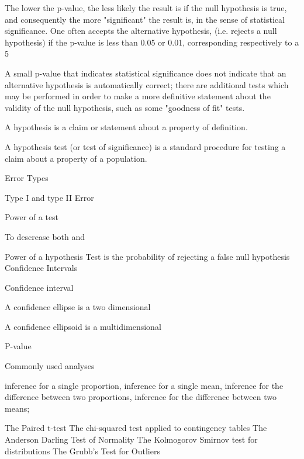 The lower the p-value, the less likely the result is if the null hypothesis is true, and consequently the more "significant" the result is, in the sense of statistical significance. One often accepts the alternative hypothesis, (i.e. rejects a null hypothesis) if the p-value is less than 0.05 or 0.01, corresponding respectively to a 5%
 
A small p-value that indicates statistical significance does not indicate that an alternative hypothesis is automatically correct; there are additional tests which may be performed in order to make a more definitive statement about the validity of the null hypothesis, such as some "goodness of fit" tests.
 
A hypothesis is a claim or statement about a property of definition.
 
A hypothesis test (or test of significance) is a standard procedure for testing a claim about a property of a population.
 
Error Types
 
Type I and type II Error
 
Power of a test
 
To descrease both  and 
 
Power of a hypothesis Test is the probability of rejecting a false null hypothesis
Confidence Intervals
 
Confidence interval
 
A confidence ellipse is a two dimensional
 
A confidence ellipsoid is a multidimensional
 
P-value

Commonly used analyses
 
inference for a single proportion,
inference for a single mean,
inference for the difference between two proportions,
inference for the difference between two means;
 
 
The Paired t-test
The chi-squared test applied to contingency tables
The Anderson Darling Test of Normality
The Kolmogorov Smirnov test for distributions
The Grubb's Test for Outliers
 
 
